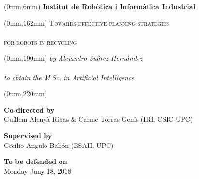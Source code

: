 \begin{titlingpage}
	\AddToShipoutPicture*{\BackgroundPic}
	
	\begin{textblock*}{205mm}(0mm,6mm)
		{\bfseries\sffamily\color{white}\LARGE\null\hfill Institut de Rob\`otica i Inform\`atica Industrial}
	\end{textblock*}
	
	\begin{textblock*}{205mm}(0mm,162mm)
		{\scshape\sffamily\color{white}\Huge\noindent\null\hfill Towards effective planning strategies\\\\%
		\null\hfill for robots in recycling}
	\end{textblock*}
	
	\begin{textblock*}{205mm}(0mm,190mm)
		{\itshape\sffamily\color{white}\LARGE\noindent\null\hfill by Alejandro Su\'arez Hern\'andez \\\\%
		\null\hfill to obtain the M.Sc. in Artificial Intelligence}
	\end{textblock*}
	
	\begin{textblock*}{210mm}(0mm,220mm)
		\begin{center}
		\textbf{Co-directed by}\\
		Guillem Aleny\`a Ribas \& Carme Torras Gen\'is  (IRI, CSIC-UPC)
		
		\vspace{0.5cm}
		
		\textbf{Supervised by}\\
		Cecilio Angulo Bah\'on (ESAII, UPC)
		
		\vspace{0.5cm}
		
		\textbf{To be defended on}\\
		Monday Juny 18, 2018
		
		\end{center}
	\end{textblock*}
	
	\mbox{} %

\end{titlingpage}